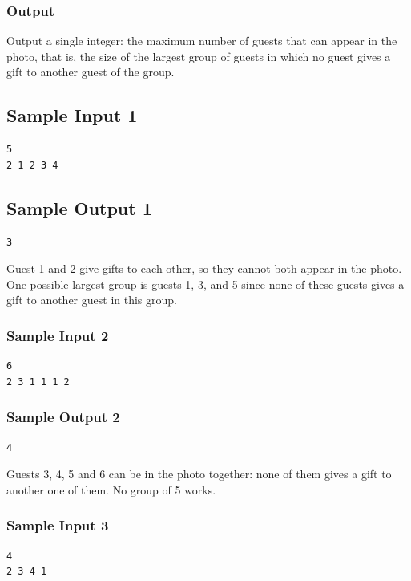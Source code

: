\documentclass[11pt]{article}
\begin{document}
\subsubsection*{Output}

Output a single integer: the maximum number of guests that can appear in the photo, that is, the size of the largest group of guests in which no guest gives a gift to another guest of the group.


\subsection*{Sample Input 1}
\begin{verbatim}
5
2 1 2 3 4
\end{verbatim}

\subsection*{Sample Output 1}
\begin{verbatim}
3
\end{verbatim}

\noindent Guest 1 and 2 give gifts to each other, so they cannot both appear in the photo. One possible largest group is guests 1, 3, and 5 since none of these guests gives a gift to another guest in this group.

\subsubsection*{Sample Input 2}
\begin{verbatim}
6
2 3 1 1 1 2
\end{verbatim}

\subsubsection*{Sample Output 2}
\begin{verbatim}
4
\end{verbatim}

\noindent Guests 3, 4, 5 and 6 can be in the photo together: none of them gives a gift to another one of them. No group of 5 works.

\subsubsection*{Sample Input 3}
\begin{verbatim}
4
2 3 4 1
\end{verbatim}
\end{document}
